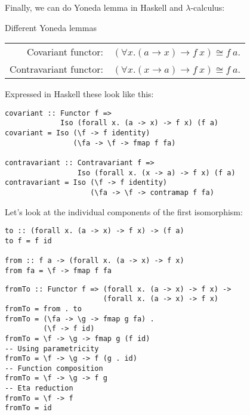 \documentclass[tikz]{beamer}
\theoremstyle{definition}
\begin{document}
\begin{frame}
Finally, we can do Yoneda lemma in Haskell and $\lambda$-calculus:

\begin{block}{Different Yoneda lemmas}
\begin{tabular}{rc}
Covariant functor:     & $(\forall x. (a \to x) \to f~x) \cong f~a$. \\
Contravariant functor: & $(\forall x. (x \to a) \to f~x) \cong f~a$.
\end{tabular}
\end{block}
\end{frame}

\begin{frame}[fragile]
Expressed in Haskell these look like this:
\begin{verbatim}
covariant :: Functor f => 
             Iso (forall x. (a -> x) -> f x) (f a)
covariant = Iso (\f -> f identity)
                (\fa -> \f -> fmap f fa)
                
contravariant :: Contravariant f => 
                 Iso (forall x. (x -> a) -> f x) (f a)
contravariant = Iso (\f -> f identity)
                    (\fa -> \f -> contramap f fa)
\end{verbatim}
\end{frame}

\begin{frame}[fragile]
Let's look at the individual components of the first isomorphism:
\begin{verbatim}
to :: (forall x. (a -> x) -> f x) -> (f a)
to f = f id
                
from :: f a -> (forall x. (a -> x) -> f x)
from fa = \f -> fmap f fa
\end{verbatim}
\end{frame}


\begin{frame}[fragile]
\begin{verbatim}
fromTo :: Functor f => (forall x. (a -> x) -> f x) ->
                       (forall x. (a -> x) -> f x)
fromTo = from . to
fromTo = (\fa -> \g -> fmap g fa) . 
         (\f -> f id)
fromTo = \f -> \g -> fmap g (f id) 
-- Using parametricity
fromTo = \f -> \g -> f (g . id)
-- Function composition
fromTo = \f -> \g -> f g
-- Eta reduction
fromTo = \f -> f
fromTo = id
\end{verbatim}
\end{frame}
\end{document}
